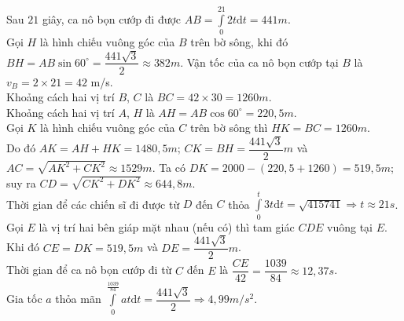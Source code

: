 \begin{ex}
{\begin{center}
\begin{tikzpicture}[declare function={d=6;b=2;c=3;},thick]
            \end{tikzpicture}
        \end{center}
    \begin{itemchoice}
        \itemch Sau $21$ giây, ca nô bọn cướp đi được $AB=\int\limits_0^{21}{2t\mathrm{d}t}=441m$.\\
        Gọi $H$ là hình chiếu vuông góc của $B$ trên bờ sông, khi đó $BH=AB\sin 60^\circ=\dfrac{441\sqrt{3}}{2}\approx 382m$.
        \itemch Vận tốc của ca nô bọn cướp tại $B$ là $v_B=2\times 21=42$ m/s.\\
        Khoảng cách hai vị trí $B$, $C$ là $BC=42\times 30=1260m$.\\
        Khoảng cách hai vị trí $A$, $H$ là $AH=AB\cos 60^\circ=220{,}5m$.\\
        Gọi $K$ là hình chiếu vuông góc của $C$ trên bờ sông thì $HK=BC=1260m$.\\
        Do đó $AK=AH+HK=1480{,}5m$; $CK=BH=\dfrac{441\sqrt{3}}{2}m$ và $AC=\sqrt{AK^2+CK^2}\approx 1529 m$.
        \itemch Ta có $DK=2000-\left(220{,}5+1260\right)=519{,}5m$; suy ra $CD=\sqrt{CK^2+DK^2}\approx 644{,}8m$.\\
        Thời gian để các chiến sĩ đi được từ $D$ đến $C$ thỏa $\displaystyle\int\limits_0^t{3t\mathrm{d}t}=\sqrt{415741}\Rightarrow t\approx 21s$.
        \itemch Gọi $E$ là vị trí hai bên giáp mặt nhau (nếu có) thì tam giác $CDE$ vuông tại $E$.\\
        Khi đó $CE=DK=519{,}5m$ và $DE=\dfrac{441\sqrt{3}}{2}m$.\\
        Thời gian để ca nô bọn cướp đi từ $C$ đến $E$ là $\dfrac{CE}{42}=\dfrac{1039}{84}\approx 12{,}37s$.\\
        Gia tốc $a$ thỏa mãn $\displaystyle\int\limits_0^{\tfrac{1039}{84}}{at \mathrm{d}t}=\dfrac{441\sqrt{3}}{2}\Rightarrow 4{,}99m/s^2$.
    \end{itemchoice}
    }
\end{ex}

